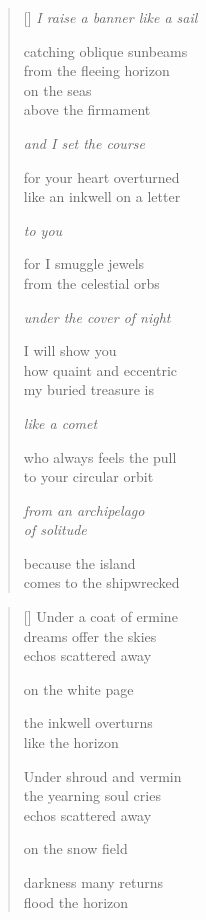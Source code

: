 \documentclass[12pt,a4paper]{article}
\begin{document}

\newpage

\poemtitle{}

\settowidth{\versewidth}{I raise a banner like a sail}

\bigskip

\begin{verse}[\versewidth]
  \emph{I raise a banner like a sail}

  catching oblique sunbeams \\
  from the fleeing horizon \\
  on the seas \\
  above the firmament

  \emph{and I set the course}

  for your heart overturned \\
  like an inkwell on a letter

  \emph{to you}

  for I smuggle jewels \\
  from the celestial orbs

  \emph{under the cover of night}

  I will show you \\
  how quaint and eccentric \\
  my buried treasure is

  \emph{like a comet}

  who always feels the pull \\
  to your circular orbit

  \emph{from an archipelago \\
  of solitude}

  because the island \\
  comes to the shipwrecked
\end{verse}


\newpage

\poemtitle{}

\settowidth{\versewidth}{Under shroud and vermin}

\bigskip

\begin{verse}[\versewidth]
  Under a coat of ermine \\
  dreams offer the skies \\
  echos scattered away

  on the white page

  the inkwell overturns \\
  like the horizon

  Under shroud and vermin \\
  the yearning soul cries \\
  echos scattered away

  on the snow field

  darkness many returns \\
  flood the horizon
\end{verse}
\end{document}
